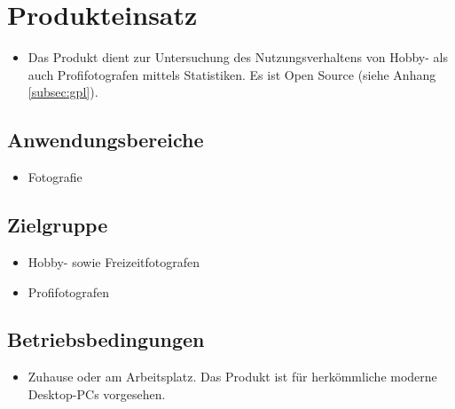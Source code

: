 \section{Produkteinsatz}
  \begin{itemize}
  \item Das Produkt dient zur Untersuchung des Nutzungsverhaltens von Hobby- als auch Profifotografen mittels Statistiken. Es ist Open Source (siehe Anhang \ref{subsec:gpl}).
  \end{itemize}
\subsection{Anwendungsbereiche}
  \begin{itemize}
  \item Fotografie
  \end{itemize}

\subsection{Zielgruppe}
	\begin{itemize}
		\item Hobby- sowie Freizeitfotografen
		\item Profifotografen		
	\end{itemize}

\subsection{Betriebsbedingungen}
  \begin{itemize}
  		\item Zuhause oder am Arbeitsplatz. Das Produkt ist für herkömmliche moderne Desktop-PCs vorgesehen.
  \end{itemize}

